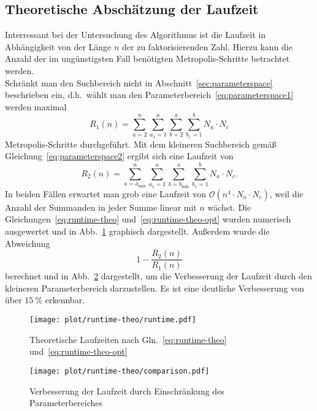 \subsection{Theoretische Abschätzung der Laufzeit}\label{sec:runtime-theo}
Interressant bei der Untersuchung des Algorithmus ist die Laufzeit in Abhängigkeit von der Länge $n$ der zu faktorisierenden Zahl. Hierzu kann die Anzahl der im ungünstigsten Fall benötigten Metropolis-Schritte betrachtet werden. \\
Schränkt man den Suchbereich nicht in Abschnitt~\ref{sec:parameterspace} beschrieben ein, d.h.\ wählt man den Parameterbereich~\ref{eq:parameterspace1} werden maximal
\begin{equation}
		R_1\left(n\right)=\sum\limits_{a=2}^{n}\sum\limits_{a_1=1}^{a}\sum\limits_{b=2}^{a}\sum\limits_{b_1=1}^{b}N_a\cdot N_c\label{eq:runtime-theo}
\end{equation}
Metropolis-Schritte durchgeführt. Mit dem kleineren Suchbereich gemäß Gleichung~\ref{eq:parameterspace2} ergibt sich eine Laufzeit von
\begin{equation}
		R_2\left(n\right)=\sum\limits_{a=a_\mathrm{min}}^{n}\sum\limits_{a_1=1}^{a}\sum\limits_{b=b_\mathrm{min}}^{a}\sum\limits_{b_1=1}^{b}N_a\cdot N_c\label{eq:runtime-theo-opt}.
\end{equation}
In beiden Fällen erwartet man grob eine Laufzeit von $\mathcal{O}\left(n^4\cdot N_a\cdot N_c\right)$, weil die Anzahl der Summanden in jeder Summe linear mit $n$ wächst. Die Gleichungen~\eqref{eq:runtime-theo} und~\eqref{eq:runtime-theo-opt} wurden numerisch ausgewertet und in Abb.~\ref{fig:runtime-theo} graphisch dargestellt. Außerdem wurde die Abweichung
\begin{equation*}
		1-\frac{R_2\left(n\right)}{R_1\left(n\right)}
\end{equation*}
berechnet und in Abb.~\ref{fig:runtime-theo-comparison} dargestellt, um die Verbesserung der Laufzeit durch den kleineren Parameterbereich darzustellen. Es ist eine deutliche Verbesserung von über $\SI{15}{\percent}$ erkennbar. \\
\begin{figure}[ht]
		\centering
		\texttt{[image: plot/runtime-theo/runtime.pdf]}
		\caption{Theoretische Laufzeiten nach Gln.~\eqref{eq:runtime-theo} und~\eqref{eq:runtime-theo-opt}}\label{fig:runtime-theo}
\end{figure}
\begin{figure}[ht]
		\centering
		\texttt{[image: plot/runtime-theo/comparison.pdf]}
		\caption{Verbesserung der Laufzeit durch Einschränkung des Parameterbereiches}\label{fig:runtime-theo-comparison}
\end{figure}
